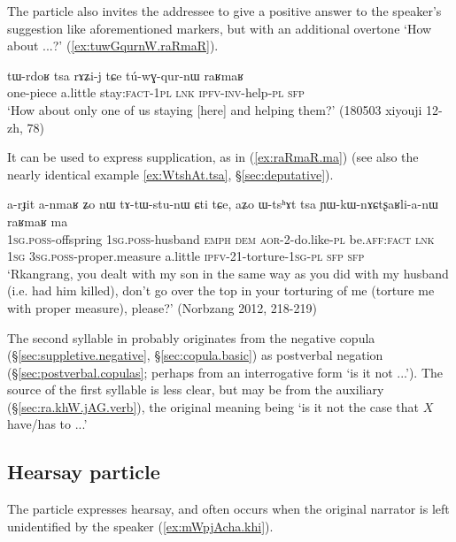 The particle  also invites the addressee to give a positive answer to the speaker's suggestion like aforementioned markers, but with an additional overtone `How about ...?' (\ref{ex:tuwGqurnW.raRmaR}).

 \begin{exe}
\ex \label{ex:tuwGqurnW.raRmaR}
\gll  tɯ-rdoʁ tsa rɤʑi-j tɕe tú-wɣ-qur-nɯ raʁmaʁ \\
one-piece a.little stay:\textsc{fact}-\textsc{1pl} \textsc{lnk} \textsc{ipfv}-\textsc{inv}-help-\textsc{pl} \textsc{sfp} \\
\glt  `How about only one of us staying [here] and helping them?'  (180503 xiyouji 12-zh, 78)
  \end{exe}
 
It can be used to express supplication, as in  (\ref{ex:raRmaR.ma}) (see also the nearly identical example \ref{ex:WtshAt.tsa}, §\ref{sec:deputative}).

 \begin{exe}
\ex \label{ex:raRmaR.ma}
\gll  a-rɟit a-nmaʁ ʑo nɯ tɤ-tɯ-stu-nɯ ɕti tɕe, aʑo ɯ-tsʰɤt tsa ɲɯ-kɯ-nɤɕtʂaʁli-a-nɯ raʁmaʁ ma \\
\textsc{1sg}.\textsc{poss}-offspring \textsc{1sg}.\textsc{poss}-husband \textsc{emph} \textsc{dem} \textsc{aor}-2-do.like-\textsc{pl} be.\textsc{aff}:\textsc{fact} \textsc{lnk}  \textsc{1sg} \textsc{3sg}.\textsc{poss}-proper.measure a.little \textsc{ipfv}-2\fl{}1-torture-\textsc{1sg}-\textsc{pl} \textsc{sfp} \textsc{sfp}  \\ 
\glt `Rkangrang, you dealt with my son in the same way as you did with my husband (i.e. had him killed), don't go over the top in your torturing of me (torture me with proper measure), please?' (Norbzang 2012, 218-219)
  \end{exe}
 
 The second syllable  in   probably originates from the negative copula  (§\ref{sec:suppletive.negative}, §\ref{sec:copula.basic}) as postverbal negation (§\ref{sec:postverbal.copulas}; perhaps from an interrogative form  `is it not ...'). The source of the first syllable  is less clear, but may be from the auxiliary  (§\ref{sec:ra.khW.jAG.verb}), the original meaning being `is it not the case that $X$ have/has to ...'
  
\subsection{Hearsay particle} \label{sec:fsp.hearsay}
The particle  expresses hearsay, and often occurs when the original narrator is left unidentified by the speaker  (\ref{ex:mWpjAcha.khi}).

